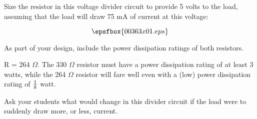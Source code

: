 

Size the resistor in this voltage divider circuit to provide 5 volts to the load, assuming that the load will draw 75 mA of current at this voltage:

$$\epsfbox{00363x01.eps}$$

As part of your design, include the power dissipation ratings of both resistors.







R = 264 $\Omega$.  The 330 $\Omega$ resistor must have a power dissipation rating of at least 3 watts, while the 264 $\Omega$ resistor will fare well even with a (low) power dissipation rating of ${1 \over 8}$ watt.







Ask your students what would change in this divider circuit if the load were to suddenly draw more, or less, current.




